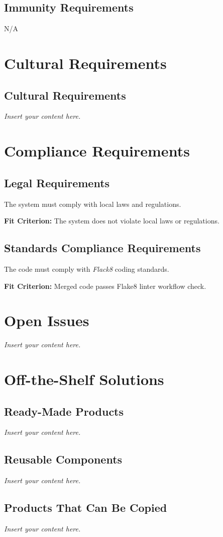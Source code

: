 \documentclass[12pt]{article}
\newcommand{\lips}{\textit{Insert your content here.}}
\begin{document}
\subsection{Immunity Requirements}
N/A

\section{Cultural Requirements}
\subsection{Cultural Requirements}
\lips

\section{Compliance Requirements}
\subsection{Legal Requirements}
The system must comply with local laws and regulations.

\textbf{Fit Criterion:} The system does not violate local laws or regulations.
\subsection{Standards Compliance Requirements}
The code must comply with \textit{Flack8} coding standards.

\textbf{Fit Criterion:} Merged code passes Flake8 linter workflow check.

\section{Open Issues}
\lips

\section{Off-the-Shelf Solutions}
\subsection{Ready-Made Products}
\lips
\subsection{Reusable Components}
\lips
\subsection{Products That Can Be Copied}
\lips
\end{document}
